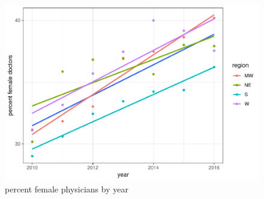\documentclass[11pt,]{article}
\makeatletter
\def\maxwidth{\ifdim\Gin@nat@width>\linewidth\linewidth
\else\Gin@nat@width\fi}
\let\Oldincludegraphics\includegraphics
\renewcommand{\includegraphics}[1]{\Oldincludegraphics[width=\maxwidth]{#1}}
\makeatother
\begin{document}
\begin{figure}
\centering
\includegraphics{main_files/figure-latex/name3-1.pdf}
\caption{percent female physicians by year}
\end{figure}
\end{document}

